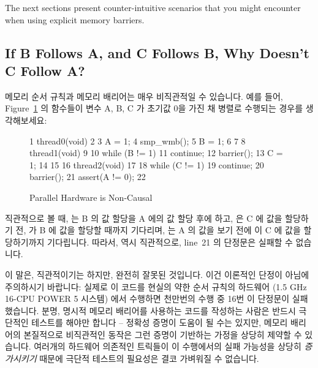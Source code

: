 The next sections present counter-intuitive scenarios that you might
encounter when using explicit memory barriers.
\fi

\subsection{If B Follows A, and C Follows B, Why Doesn't C Follow A?}
\label{sec:advsync:If B Follows A, and C Follows B, Why Doesn't C Follow A?}

메모리 순서 규칙과 메모리 배리어는 매우 비직관적일 수 있습니다.
예를 들어, Figure~\ref{fig:advsync:Parallel Hardware is Non-Causal} 의 함수들이
변수 A, B, C 가 초기값 0을 가진 채 병렬로 수행되는 경우를 생각해보세요:

\begin{figure}[htbp]
{ \scriptsize
\begin{verbbox}
  1 thread0(void)
  2 {
  3   A = 1;
  4   smp_wmb();
  5   B = 1;
  6 }
  7
  8 thread1(void)
  9 {
 10   while (B != 1)
 11     continue;
 12   barrier();
 13   C = 1;
 14 }
 15
 16 thread2(void)
 17 {
 18   while (C != 1)
 19     continue;
 20   barrier();
 21   assert(A != 0);
 22 }
\end{verbbox}
}
\centering
\theverbbox
\caption{Parallel Hardware is Non-Causal}
\label{fig:advsync:Parallel Hardware is Non-Causal}
\end{figure}

직관적으로 볼 때,  는 B 의 값 할당을 A 에의 값 할당 후에 하고,
 은 C 에 값을 할당하기 전,  가 B 에 값을 할당할
때까지 기다리며,  는 A 의 값을 보기 전에  이 C 에
값을 할당하기까지 기다립니다.
따라서, 역시 직관적으로, line~21 의 단정문은 실패할 수 없습니다.

이 말은, 직관적이기는 하지만, 완전히 잘못된 것입니다.
이건 이론적인 단정이 아님에 주의하시기 바랍니다: 실제로 이 코드를 현실의 약한
순서 규칙의 하드웨어 (1.5 GHz 16-CPU POWER 5 시스템) 에서 수행하면 천만번의
수행 중 16번 이 단정문이 실패했습니다.
분명, 명시적 메모리 배리어를 사용하는 코드를 작성하는 사람은 반드시 극단적인
테스트를 해야만 합니다 -- 정확성 증명이 도움이 될 수는 있지만, 메모리 배리어의
본질적으로 비직관적인 동작은 그런 증명이 기반하는 가정을 상당히 제약할 수
있습니다.
여러개의 하드웨어 의존적인 트릭들이 이 수행에서의 실패 가능성을 상당히
\emph{증가시키기} 때문에 극단적 테스트의 필요성은 결코 가벼워질 수 없습니다.
\iffalse

